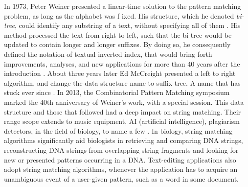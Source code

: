 \documentclass[12pt]{article} %
\begin{document}
In 1973, Peter Weiner presented a linear-time solution to the pattern matching problem, as long as the alphabet was f
ixed. His structure, which he denoted \emph{bi-tree}, could identify any substring of a text, without specifying all of them \cite{apostolico201640}. His method processed the text from right to left,  such that the bi-tree would be updated to contain longer and longer suffixes. By doing so, he consequently defined the notation of textual inverted index, that would bring forth improvements, analyses, and new applications for more than 40 years after the introduction \cite{apostolico201640}. About three years later Ed McCreight presented a left to right algorithm, and change the data structure name to suffix tree. A name that has stuck ever since \cite{ apostolico201640}. In 2013, the Combinatorial Pattern Matching symposium marked the 40th anniversary of Weiner’s work, with a special session. This data structure and those that followed had a deep impact on string matching. Their range scope extends to music equipment, AI (artificial intelligence), plagiarism detectors, in the field of biology, to name a few \cite{detection, apostolico201640}. In biology, string matching algorithms significantly aid biologists in retrieving and comparing DNA strings, reconstructing DNA strings from overlapping string fragments and looking for new or presented patterns occurring in a DNA\cite{gusfield}. Text-editing applications also adopt string matching algorithms, whenever the application has to acquire an unambiguous event of a user-given pattern, such as a word in some document\cite{introduction, gusfield}. 
\end{document}
